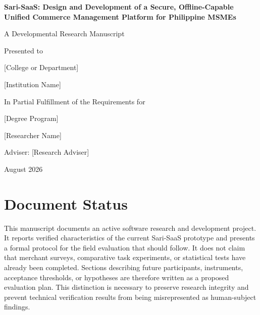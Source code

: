 \documentclass[12pt,oneside]{report}
\newcommand{\ResearchTitle}{Sari-SaaS: Design and Development of a Secure, Offline-Capable Unified Commerce Management Platform for Philippine MSMEs}
\newcommand{\ResearchAuthor}{[Researcher Name]}
\newcommand{\Institution}{[Institution Name]}
\newcommand{\DepartmentName}{[College or Department]}
\newcommand{\DegreeProgram}{[Degree Program]}
\newcommand{\ResearchAdviser}{[Research Adviser]}
\newcommand{\SubmissionDate}{August 2026}
\begin{document}
\hypersetup{pageanchor=false}
\begin{titlepage}
  \centering
  \vspace*{0.8in}
  {\Large\bfseries \ResearchTitle\par}
  \vspace{1.2in}
  {\large A Developmental Research Manuscript\par}
  \vspace{0.35in}
  {\large Presented to\par}
  {\large \DepartmentName\par}
  {\large \Institution\par}
  \vspace{0.9in}
  {\large In Partial Fulfillment of the Requirements for\par}
  {\large \DegreeProgram\par}
  \vfill
  {\large \ResearchAuthor\par}
  \vspace{0.25in}
  {\large Adviser: \ResearchAdviser\par}
  \vspace{0.5in}
  {\large \SubmissionDate\par}
\end{titlepage}
\hypersetup{pageanchor=true}


\chapter*{Document Status}
This manuscript documents an active software research and development project.
It reports verified characteristics of the current Sari-SaaS prototype and
presents a formal protocol for the field evaluation that should follow. It does
not claim that merchant surveys, comparative task experiments, or statistical
tests have already been completed. Sections describing future participants,
instruments, acceptance thresholds, or hypotheses are therefore written as a
proposed evaluation plan. This distinction is necessary to preserve research
integrity and prevent technical verification results from being misrepresented
as human-subject findings.
\end{document}
